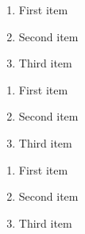 \documentclass{article}
\begin{document}
\begin{enumerate}
	\item First item
	\item Second item
	\item Third item
\end{enumerate}    


\begin{enumerate}[label=\roman*)]
    \item First item
    \item Second item
    \item Third item
\end{enumerate}

\begin{enumerate}[label=\Roman*.]
    \item First item
    \item Second item
    \item Third item
\end{enumerate}
    
\end{document}
